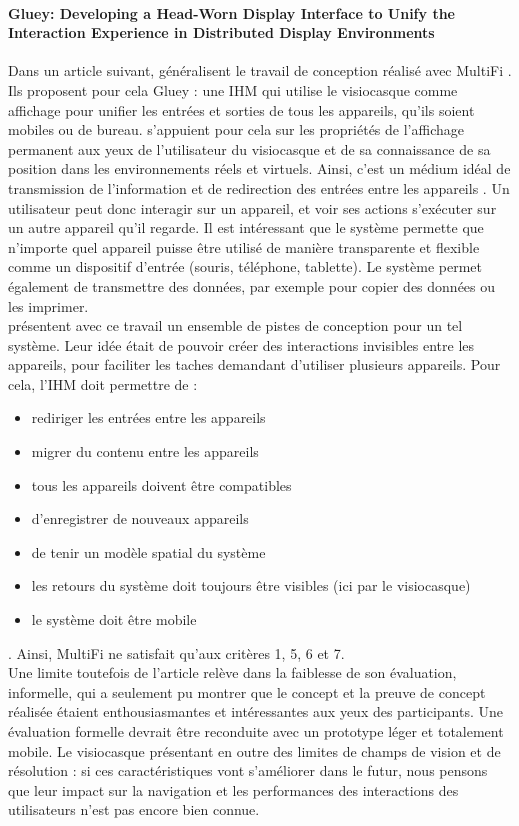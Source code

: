 \paragraph{\foreignlanguage{english}{Gluey: Developing a Head-Worn Display Interface to Unify the Interaction Experience in Distributed Display Environments}}
Dans un article suivant, \cite{SerranoEnsYangEtAl2015} généralisent le travail de conception réalisé avec MultiFi \citep{GrubertHeinischQuigleyEtAl2015}. Ils proposent pour cela Gluey : une IHM qui utilise le visiocasque comme affichage pour unifier les entrées et sorties de tous les appareils, qu'ils soient mobiles ou de bureau. \citeauthor{SerranoEnsYangEtAl2015} s'appuient pour cela sur les propriétés de l'affichage permanent aux yeux de l'utilisateur du visiocasque et de sa connaissance de sa position dans les environnements réels et virtuels. Ainsi, c'est un médium idéal de transmission de l'information et de redirection des entrées entre les appareils .
Un utilisateur peut donc interagir sur un appareil, et voir ses actions s'exécuter sur un autre appareil qu'il regarde. Il est intéressant que le système permette que n'importe quel appareil puisse être utilisé de manière transparente et flexible comme un dispositif d'entrée (souris, téléphone, tablette). Le système permet également de transmettre des données, par exemple pour copier des données ou les imprimer.\\
\citeauthor{SerranoEnsYangEtAl2015} présentent avec ce travail un ensemble de pistes de conception pour un tel système. Leur idée était de pouvoir créer des interactions invisibles entre les appareils, pour faciliter les taches demandant d'utiliser plusieurs appareils. Pour cela, l'IHM doit permettre de : 
\begin{itemize}
  \item rediriger les entrées entre les appareils
  \item migrer du contenu entre les appareils
  \item tous les appareils doivent être compatibles
  \item d'enregistrer de nouveaux appareils
  \item de tenir un modèle spatial du système
  \item les retours du système doit toujours être visibles (ici par le visiocasque)
  \item le système doit être mobile
\end{itemize}. Ainsi, MultiFi \citep{GrubertHeinischQuigleyEtAl2015} ne satisfait qu'aux critères 1, 5, 6 et 7.\\
Une limite toutefois de l'article relève dans la faiblesse de son évaluation, informelle, qui a seulement pu montrer que le concept et la preuve de concept réalisée étaient enthousiasmantes et intéressantes aux yeux des participants. Une évaluation formelle devrait être reconduite avec un prototype léger et totalement mobile. Le visiocasque présentant en outre des limites de champs de vision et de résolution : si ces caractéristiques vont s'améliorer dans le futur, nous pensons que leur impact sur la navigation et les performances des interactions des utilisateurs n'est pas encore bien connue.

